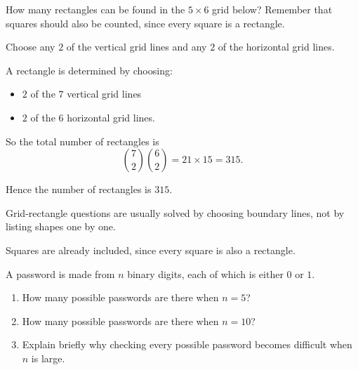 \begin{problem}
How many rectangles can be found in the $5\times 6$ grid below? Remember that squares should also be counted, since every square is a rectangle.

\begin{center}
\end{center}
\end{problem}

\begin{hint}
Choose any $2$ of the vertical grid lines and any $2$ of the horizontal grid lines.
\end{hint}

\begin{solution}
A rectangle is determined by choosing:
\begin{itemize}[leftmargin=*]
  \item $2$ of the $7$ vertical grid lines
  \item $2$ of the $6$ horizontal grid lines.
\end{itemize}

So the total number of rectangles is
\[
\binom{7}{2}\binom{6}{2}=21\times 15=315.
\]

Hence the number of rectangles is $\boxed{315}$.
\end{solution}

\begin{takeaways}
\item Grid-rectangle questions are usually solved by choosing boundary lines, not by listing shapes one by one.
\item Squares are already included, since every square is also a rectangle.
\end{takeaways}

\begin{problem}
A password is made from $n$ binary digits, each of which is either $0$ or $1$.

\begin{enumerate}[label=\alph*)]
\item How many possible passwords are there when $n=5$?
\item How many possible passwords are there when $n=10$?
\item Explain briefly why checking every possible password becomes difficult when $n$ is large.
\end{enumerate}
\end{problem}

